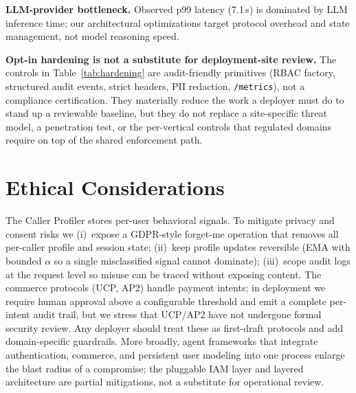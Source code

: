 \documentclass[11pt]{article}
\begin{document}
\textbf{LLM-provider bottleneck.} Observed p99 latency (7.1\,s) is dominated by LLM inference time; our architectural optimizations target protocol overhead and state management, not model reasoning speed.

\textbf{Opt-in hardening is not a substitute for deployment-site review.} The controls in Table~\ref{tab:hardening} are audit-friendly primitives (RBAC factory, structured audit events, strict headers, PII redaction, \texttt{/metrics}), not a compliance certification. They materially reduce the work a deployer must do to stand up a reviewable baseline, but they do not replace a site-specific threat model, a penetration test, or the per-vertical controls that regulated domains require on top of the shared enforcement path.

\section*{Ethical Considerations}

The Caller Profiler stores per-user behavioral signals. To mitigate privacy and consent risks we (i)~expose a GDPR-style forget-me operation that removes all per-caller profile and session state; (ii)~keep profile updates reversible (EMA with bounded $\alpha$ so a single misclassified signal cannot dominate); (iii)~scope audit logs at the request level so misuse can be traced without exposing content. The commerce protocols (UCP, AP2) handle payment intents; in deployment we require human approval above a configurable threshold and emit a complete per-intent audit trail, but we stress that UCP/AP2 have not undergone formal security review. Any deployer should treat these as first-draft protocols and add domain-specific guardrails. More broadly, agent frameworks that integrate authentication, commerce, and persistent user modeling into one process enlarge the blast radius of a compromise; the pluggable IAM layer and layered architecture are partial mitigations, not a substitute for operational review.


\end{document}

